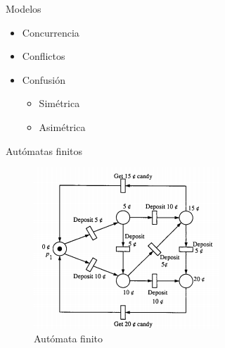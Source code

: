 \documentclass[
compress,
xcolor=table,
dvipsnames,
]{beamer}
\begin{document}

\begin{frame}{Modelos}
    \begin{itemize}
        \item Concurrencia
        \item Conflictos
        \item Confusión
            \begin{itemize}
                \item Simétrica
                \item Asimétrica
            \end{itemize}
    \end{itemize}
\end{frame}


\begin{frame}{Autómatas finitos}
    \begin{figure}[h]
        \includegraphics[scale=0.8]{graphics/af_rp.png}
        \caption{Autómata finito \citep{Murata:89}}
    \end{figure}
\end{frame}
\end{document}
